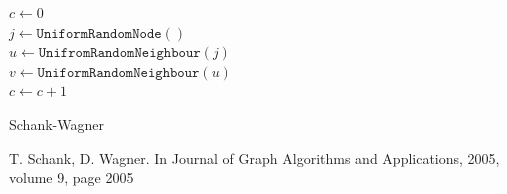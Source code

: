 \documentclass[landscape,a1paper, fontscale=0.285]{baposter}
\begin{document}
\begin{poster}
{\begin{algorithm}[H]
        $c \gets 0$\\
        {
        $j \gets\mathtt{UniformRandomNode}\left(\right)$\\
        $u \gets\mathtt{UnifromRandomNeighbour}\left(j\right)$\\
        {
            $v \gets \mathtt{UniformRandomNeighbour}\left(u\right)$\\
        }
        {
            $c \gets c + 1$\\
        }
    }
        \caption{Schank-Wagner}
    \end{algorithm}
}
{
    \small
    
    \begin{thebibliography}{1}
            T. Schank, D. Wagner.
                        \newblock In {Journal of Graph Algorithms and
                        Applications, 2005, volume 9, page 2005}
    \end{thebibliography}
}
\end{poster}
\end{document}
